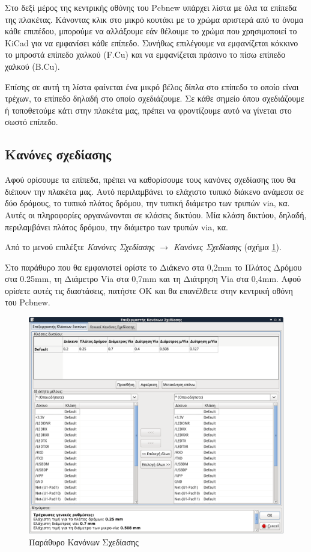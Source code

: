 \documentclass[a4paper]{article}
\begin{document}
Στο δεξί μέρος της κεντρικής οθόνης του Pcbnew υπάρχει λίστα με όλα τα επίπεδα της πλακέτας. Κάνοντας κλικ στο μικρό κουτάκι με το χρώμα αριστερά από το όνομα κάθε επιπέδου, μπορούμε να αλλάξουμε εάν θέλουμε το χρώμα που χρησιμοποιεί το \textenglish{KiCad} για να εμφανίσει κάθε επίπεδο. Συνήθως επιλέγουμε να εμφανίζεται κόκκινο το μπροστά επίπεδο χαλκού (F.Cu) και να εμφανίζεται πράσινο το πίσω επίπεδο χαλκού (B.Cu).

Επίσης σε αυτή τη λίστα φαίνεται ένα μικρό βέλος δίπλα στο επίπεδο το οποίο είναι τρέχων, το επίπεδο δηλαδή στο οποίο σχεδιάζουμε. Σε κάθε σημείο όπου σχεδιάζουμε ή τοποθετούμε κάτι στην πλακέτα μας, πρέπει να φροντίζουμε αυτό να γίνεται στο σωστό επίπεδο.

\subsection{Κανόνες σχεδίασης}
Αφού ορίσουμε τα επίπεδα, πρέπει να καθορίσουμε τους κανόνες σχεδίασης που θα διέπουν την πλακέτα μας. Αυτό περιλαμβάνει το ελάχιστο τυπικό διάκενο ανάμεσα σε δύο δρόμους, το τυπικό πλάτος δρόμου, την τυπική διάμετρο των τρυπών via, κα. Αυτές οι πληροφορίες οργανώνονται σε κλάσεις δικτύου. Μία κλάση δικτύου, δηλαδή, περιλαμβάνει πλάτος δρόμου, την διάμετρο των τρυπών via, κα. 

Από το μενού επιλέξτε \textit{Κανόνες Σχεδίασης $\rightarrow$ Κανόνες Σχεδίασης} (σχήμα \ref{fig:pcb-dial-desset}). 

Στο παράθυρο που θα εμφανιστεί ορίστε το Διάκενο στα 0,2mm το Πλάτος Δρόμου στα 0.25mm, τη Διάμετρο Via στα 0,7mm και τη Διάτρηση Via στα 0,4mm. Αφού ορίσετε αυτές τις διαστάσεις, πατήστε ΟΚ και θα επανέλθετε στην κεντρική οθόνη του Pcbnew.

\begin{figure}
  \begin{center}
    \includegraphics[width=.9\textwidth]{img/pcb-dial-desset.png}
    \caption{Παράθυρο Κανόνων Σχεδίασης}
    \label{fig:pcb-dial-desset}
  \end{center}
\end{figure}
\end{document}
